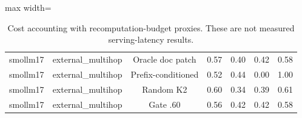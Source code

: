 \begin{table}[t]
\begin{adjustbox}{max width=\textwidth}
\begin{tabular}{ccccccc}
smollm17 & external\_multihop & Oracle doc patch & 0.57 & 0.40 & 0.42 & 0.58 \\
smollm17 & external\_multihop & Prefix-conditioned & 0.52 & 0.44 & 0.00 & 1.00 \\
smollm17 & external\_multihop & Random K2 & 0.60 & 0.34 & 0.39 & 0.61 \\
smollm17 & external\_multihop & Gate .60 & 0.56 & 0.42 & 0.42 & 0.58 \\
\bottomrule
\end{tabular}
\end{adjustbox}
\caption{Cost accounting with recomputation-budget proxies. These are not measured serving-latency results.}
\label{tab:cost}\end{table}
